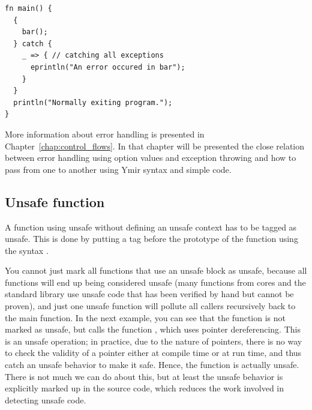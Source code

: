 
\begin{lstlisting}[style=coloredverbatim]
fn main() {
  {
    bar();
  } catch {
    _ => { // catching all exceptions
      eprintln("An error occured in bar");
    }
  }
  println("Normally exiting program.");
}
\end{lstlisting}


More information about error handling is presented in
Chapter~\ref{chap:control_flows}. In that chapter will be presented the close
relation between error handling using option values and exception throwing and
how to pass from one to another using Ymir syntax and simple code.

\subsection {Unsafe function}

A function using unsafe without defining an unsafe context has to be tagged as
unsafe. This is done by putting a tag before the prototype of the function using
the syntax .



You cannot just mark all functions that use an unsafe block as unsafe, because
all functions will end up being considered unsafe (many functions from cores and
the standard library use unsafe code that has been verified by hand but cannot
be proven), and just one unsafe function will pollute all callers recursively
back to the main function. In the next example, you can see that the function
 is not marked as unsafe, but calls the function , which
uses pointer dereferencing. This is an unsafe operation; in practice, due to the
nature of pointers, there is no way to check the validity of a pointer either at
compile time or at run time, and thus catch an unsafe behavior to make it safe.
Hence, the  function is actually unsafe. There is not much we can do
about this, but at least the unsafe behavior is explicitly marked up in the
source code, which reduces the work involved in detecting unsafe code.

